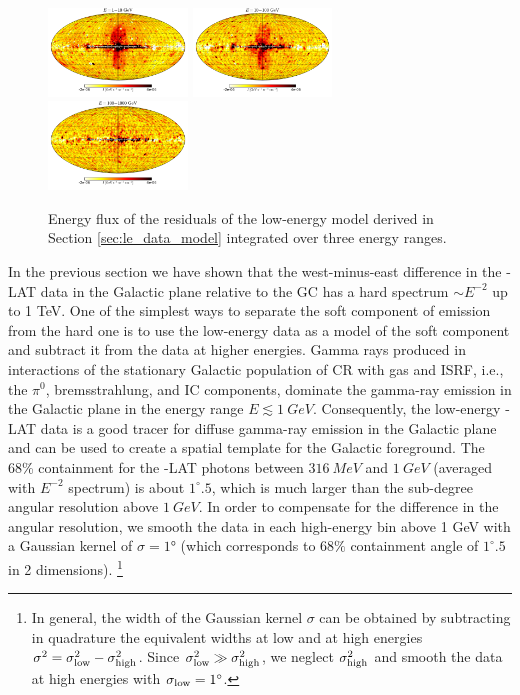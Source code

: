 \begin{figure}[t]
\includegraphics[width=0.33\textwidth]{plots/Mollweide_LowE_03-10GeV_flux_source_range_0.pdf}
\includegraphics[width=0.33\textwidth]{plots/Mollweide_LowE_03-10GeV_flux_source_range_1.pdf}
\includegraphics[width=0.33\textwidth]{plots/Mollweide_LowE_03-10GeV_flux_source_range_2.pdf}
\caption{Energy flux of the residuals of the low-energy model derived in Section \ref{sec:le_data_model}
integrated over three energy ranges. }
\label{fig:Maps_lowE}
\end{figure}


In the previous section we have shown that the west-minus-east difference in the \Fermi-LAT data in the Galactic plane relative to the GC has a hard 
spectrum $\sim E^{-2}$ up to 1 TeV.
One of the simplest ways to separate the soft component of emission from the hard one is to use the low-energy data as
a model of the soft component and subtract it from the data at higher energies.
Gamma rays produced in interactions of the stationary Galactic population of CR with gas and ISRF,
i.e., the $\pi^0$, bremsstrahlung, and IC components,
dominate the gamma-ray emission in the Galactic plane in the energy range $E \lesssim \SI{1}{GeV}$. 
Consequently, the low-energy \Fermi-LAT data is a good tracer for diffuse gamma-ray emission in the Galactic plane and can be used to create a spatial template for the Galactic foreground.
The 68\% containment for the \Fermi-LAT photons between $\SI{316}{MeV}$ and $\SI{1}{GeV}$ (averaged with $E^{-2}$ spectrum) is about $1^\circ\!\!.5$,
which is much larger than the sub-degree angular resolution above $\SI{1}{GeV}$.
In order to compensate for the difference in the angular resolution, 
we smooth the data in each high-energy bin above 1 GeV
with a Gaussian kernel of $\sigma = \ang{1}$ (which corresponds to $68\%$ containment angle of
$1^\circ\!\!.5$ in 2 dimensions).%
\footnote{In general, the width of the Gaussian kernel $\sigma$ can be obtained by subtracting in quadrature
the equivalent widths at low and at high energies $\sigma^2 = \sigma_{\rm low}^2 - \sigma_{\rm high}^2$.
Since $\sigma_{\rm low}^2 \gg \sigma_{\rm high}^2$, we neglect $\sigma_{\rm high}^2$ and smooth the 
data at high energies with $\sigma_{\rm low} = 1^\circ$.}

